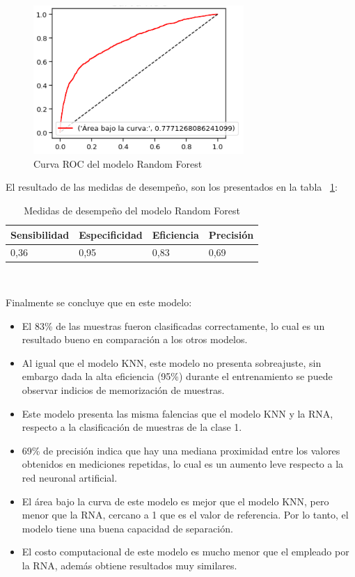 \documentclass[conference]{IEEEtran}
\begin{document}
\begin{center}
    \begin{figure}[H]
        \hfill
     \centerline{\includegraphics[width=8cm]{ROCRDF.png}}
    \caption{Curva ROC del modelo Random Forest }
    \label{fig:rocRDF}
    \end{figure}  
\end{center}

El resultado de las medidas de desempeño, son los presentados en la tabla ~\ref{tab:medidasRDF}:
\newline
\begin{table}[H]
\centering
\begin{tabular}{|l|l|l|l|}
\hline
Sensibilidad & Especificidad & \multicolumn{1}{r|}{Eficiencia} & Precisión \\ \hline
0,36         & 0,95          & 0,83                            & 0,69      \\ \hline
\end{tabular}\hfill\\
\caption{Medidas de desempeño del modelo Random Forest}
\label{tab:medidasRDF}
\end{table}
Finalmente se concluye que en este modelo:
\begin{itemize}
\item El 83\% de las muestras fueron clasificadas correctamente, lo cual es un resultado bueno en comparación a los otros modelos.
\item Al igual que el modelo KNN, este modelo no presenta sobreajuste, sin embargo dada la alta eficiencia (95\%) durante el entrenamiento se puede observar indicios de memorización de muestras.
\item Este modelo presenta las misma falencias que el modelo KNN y la RNA, respecto a la clasificación de muestras de la clase 1.
\item 69\% de precisión indica que hay una mediana proximidad entre los valores obtenidos en mediciones repetidas, lo cual es un aumento leve respecto a la red neuronal artificial.
\item El área bajo la curva de este modelo es mejor que el modelo KNN, pero menor que la RNA, cercano a 1 que es el valor de referencia. Por lo tanto, el modelo  tiene una buena capacidad de separación.
\item El costo computacional de este modelo es mucho menor que el empleado por la RNA, además obtiene resultados muy similares.
\end{itemize}
\end{document}
